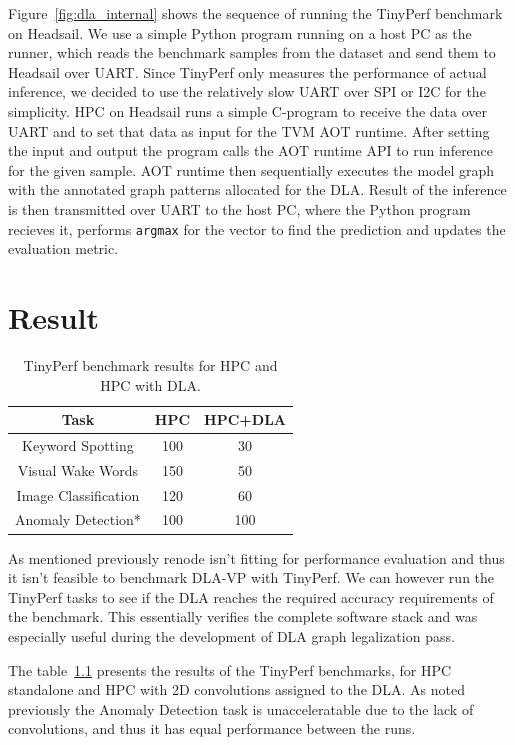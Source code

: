 \documentclass[12pt,a4paper,english
]{tunithesis}
\begin{document}
Figure~\ref{fig:dla_internal} shows the sequence of running the TinyPerf benchmark on Headsail. We use a simple Python program running on a host PC as the runner, which reads the benchmark samples from the dataset and send them to Headsail over UART. Since TinyPerf only measures the performance of actual inference, we decided to use the relatively slow UART over SPI or I2C for the simplicity. HPC on Headsail runs a simple C-program to receive the data over UART and to set that data as input for the TVM AOT runtime. After setting the input and output the program calls the AOT runtime API to run inference for the given sample. AOT runtime then sequentially executes the model graph with the annotated graph patterns allocated for the DLA. Result of the inference is then transmitted over UART to the host PC, where the Python program recieves it, performs \texttt{argmax} for the vector to find the prediction and updates the evaluation metric.

\chapter{Result}
\begin{table}[h]
\centering
\begin{tabular}{|c|c|c|}
\hline
\textbf{Task} & \textbf{HPC} & \textbf{HPC+DLA} \\ \hline
Keyword Spotting & 100 &  30 \\ \hline
Visual Wake Words & 150 & 50 \\ \hline
Image Classification &  120 & 60  \\ \hline
Anomaly Detection* & 100  & 100  \\ \hline
\end{tabular}
\caption{TinyPerf benchmark results for HPC and HPC with DLA.}
\label{tab:benchmark-results}
\end{table}

As mentioned previously renode isn't fitting for performance evaluation and thus it isn't feasible to benchmark DLA-VP with TinyPerf. We can however run the TinyPerf tasks to see if the DLA reaches the required accuracy requirements of the benchmark. This essentially verifies the complete software stack and was especially useful during the development of DLA graph legalization pass.

The table~\ref{tab:benchmark-results} presents the results of the TinyPerf benchmarks, for HPC standalone and HPC with 2D convolutions assigned to the DLA. As noted previously the Anomaly Detection task is unacceleratable due to the lack of convolutions, and thus it has equal performance between the runs.
\end{document}
